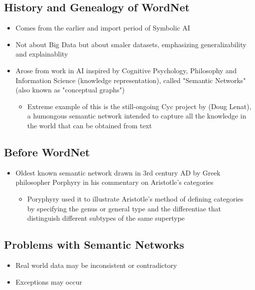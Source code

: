 \documentclass[a4paper]{article}
\begin{document}
\subsection{History and Genealogy of WordNet}
\begin{itemize}
    \item  Comes from the earlier and import period of Symbolic AI
    \item Not about Big Data but about smaler datasets, emphasizing generalizability and explainablity
    \item Arose from work in AI inspired by Cognitive Psychology, Philosophy and Information Science (knowledge representation), called "Semantic Networks" (also known as "conceptual graphs")
    \begin{itemize}[label=$\circ$]
        \item Extreme example of this is the still-ongoing Cyc project by (Doug Lenat), a humongous semantic network intended to capture all the knowledge in the world that can be obtained from text
    \end{itemize}
\end{itemize}

\subsection{Before WordNet}
\begin{itemize}
    \item Oldest known semantic network drawn in 3rd century AD by Greek philosopher Porphyry in his commentary on Aristotle's categories
    \begin{itemize}[label=$\circ$]
        \item Poryphyry used it to illustrate Aristotle's method of defining categories by specifying the genus or general type and the differentiae that distinguish different subtypes of the same supertype
    \end{itemize}
\end{itemize}

\subsection{Problems with Semantic Networks}
\begin{itemize}
    \item Real world data may be inconsistent or contradictory
    \item Exceptions may occur
\end{itemize}
\end{document}
